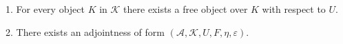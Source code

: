1. For every object $K$ in $\mathcal{K}$ there exists a free object over $K$ with respect to $U$.

2. There exists an adjointness of form $(\mathcal{A}, \mathcal{K}, U, F, \eta, \varepsilon)$.